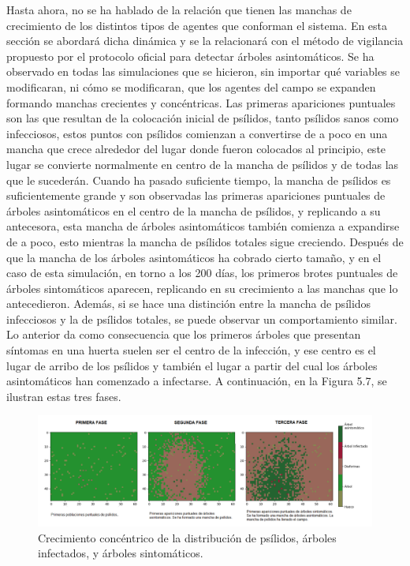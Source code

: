 Hasta ahora, no se ha hablado de la relación que tienen las manchas de crecimiento de los distintos tipos de agentes que conforman el sistema. En esta sección se abordará dicha dinámica y se la relacionará con el método de vigilancia propuesto por el protocolo oficial para detectar árboles asintomáticos. Se ha observado en todas las simulaciones que se hicieron, sin importar qué variables se modificaran, ni cómo se modificaran, que los agentes del campo se expanden formando manchas crecientes y concéntricas.
Las primeras apariciones puntuales son las que resultan de la colocación inicial de psílidos, tanto psílidos sanos como infecciosos, estos puntos con psílidos comienzan a convertirse de a poco en una mancha que crece alrededor del lugar donde fueron colocados al principio, este lugar se convierte normalmente en centro de la mancha de psílidos y de todas las que le sucederán. Cuando ha pasado suficiente tiempo, la mancha de psílidos es suficientemente grande y son observadas las primeras apariciones puntuales de árboles asintomáticos en el centro de la mancha de psílidos, y replicando a su antecesora, esta mancha de árboles asintomáticos también comienza a expandirse de a poco, esto mientras la mancha de psílidos totales sigue creciendo. Después de que la mancha de los árboles asintomáticos ha cobrado cierto tamaño, y en el caso de esta simulación, en torno a los 200 días, los primeros brotes puntuales de árboles sintomáticos aparecen, replicando en su crecimiento a las manchas que lo antecedieron. Además, si se hace una distinción entre la mancha de psílidos infecciosos y la de psílidos totales, se puede observar un comportamiento similar.
Lo anterior da como consecuencia que los primeros árboles que presentan síntomas en una huerta suelen ser el centro de la infección, y ese centro es el lugar de arribo de los psílidos y también el lugar a partir del cual los árboles asintomáticos han comenzado a infectarse. A continuación, en la Figura 5.7, se ilustran estas tres fases.
\begin{figure}[H]
\centering
\includegraphics[width=1.05\textwidth,keepaspectratio=true]{images/Imágenes C6/C6-6.png}
\caption{Crecimiento concéntrico de la distribución de psílidos, árboles infectados, y árboles sintomáticos.}
\end{figure}


